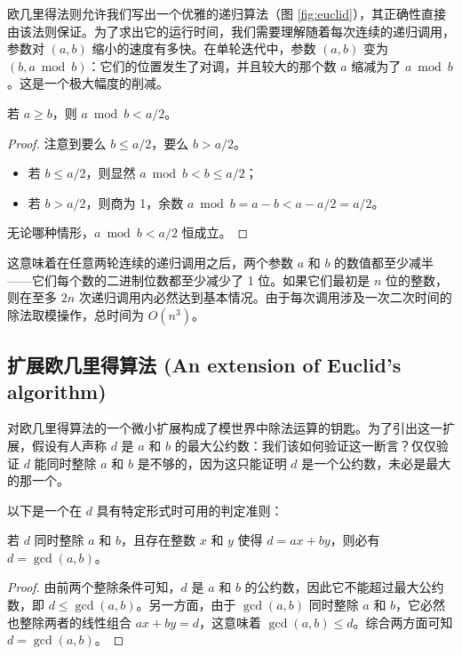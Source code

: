 欧几里得法则允许我们写出一个优雅的递归算法（图 \ref{fig:euclid}），其正确性直接由该法则保证。为了求出它的运行时间，我们需要理解随着每次连续的递归调用，参数对 $(a, b)$ 缩小的速度有多快。在单轮迭代中，参数 $(a, b)$ 变为 $(b, a \bmod b)$：它们的位置发生了对调，并且较大的那个数 $a$ 缩减为了 $a \bmod b$。这是一个极大幅度的削减。

\begin{lemma}
若 $a \ge b$，则 $a \bmod b < a/2$。
\end{lemma}

\begin{proof}
注意到要么 $b \le a/2$，要么 $b > a/2$。
\begin{itemize}
    \item 若 $b \le a/2$，则显然 $a \bmod b < b \le a/2$；
    \item 若 $b > a/2$，则商为 1，余数 $a \bmod b = a - b < a - a/2 = a/2$。
\end{itemize}
无论哪种情形，$a \bmod b < a/2$ 恒成立。
\end{proof}

这意味着在任意两轮连续的递归调用之后，两个参数 $a$ 和 $b$ 的数值都至少减半——它们每个数的二进制位数都至少减少了 1 位。如果它们最初是 $n$ 位的整数，则在至多 $2n$ 次递归调用内必然达到基本情况。由于每次调用涉及一次二次时间的除法取模操作，总时间为 $O(n^3)$。

\subsection{扩展欧几里得算法 (An extension of Euclid's algorithm)}
对欧几里得算法的一个微小扩展构成了模世界中除法运算的钥匙。为了引出这一扩展，假设有人声称 $d$ 是 $a$ 和 $b$ 的最大公约数：我们该如何验证这一断言？仅仅验证 $d$ 能同时整除 $a$ 和 $b$ 是不够的，因为这只能证明 $d$ 是一个公约数，未必是最大的那一个。

以下是一个在 $d$ 具有特定形式时可用的判定准则：

\begin{lemma}
若 $d$ 同时整除 $a$ 和 $b$，且存在整数 $x$ 和 $y$ 使得 $d = ax + by$，则必有 $d = \gcd(a, b)$。
\end{lemma}

\begin{proof}
由前两个整除条件可知，$d$ 是 $a$ 和 $b$ 的公约数，因此它不能超过最大公约数，即 $d \le \gcd(a, b)$。另一方面，由于 $\gcd(a, b)$ 同时整除 $a$ 和 $b$，它必然也整除两者的线性组合 $ax + by = d$，这意味着 $\gcd(a, b) \le d$。综合两方面可知 $d = \gcd(a, b)$。
\end{proof}

